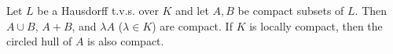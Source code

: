 Let $L$ be a Hausdorff t.v.s. over $K$ and let $A, B$ be compact subsets of $L$. Then $A \cup B$, $A + B$, and $\lambda A$ ($\lambda \in K$) are compact. If $K$ is locally compact, then the circled hull of $A$ is also compact.
